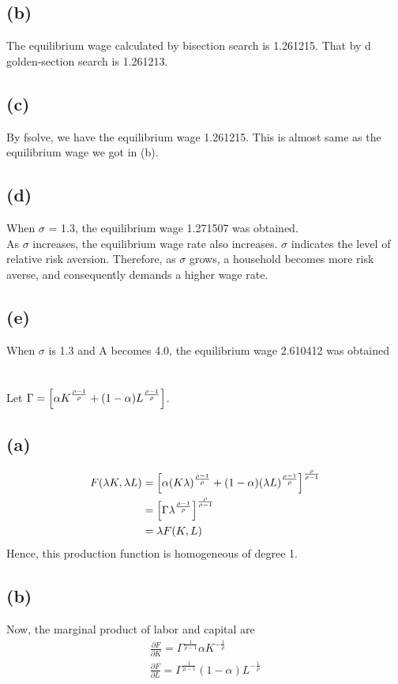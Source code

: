 \documentclass[a4paper]{article}
\begin{document}
\subsection*{(b)}
The equilibrium wage calculated by bisection search is 1.261215. That by d golden-section search is 1.261213.

\subsection*{(c)}
By fsolve, we have the equilibrium wage 1.261215. This is almost same as the equilibrium wage we got in (b).

\subsection*{(d)}
When $\sigma$ = 1.3, the equilibrium wage 1.271507 was obtained. \\
As $\sigma$ increases, the equilibrium wage rate also increases. $\sigma$ indicates the level of relative risk aversion. Therefore, as $\sigma$ grows, a household becomes more risk averse, and consequently demands a higher wage rate.

\subsection*{(e)}
When $\sigma$ is 1.3 and A becomes 4.0, the equilibrium wage 2.610412 was obtained


\section{} %
Let $\Gamma = \qty[ \alpha K^{\frac{\rho-1}{\rho}}+(1-\alpha)L^{\frac{\rho-1}{\rho}} ]$.

\subsection*{(a)}
\begin{align*}
    F(\lambda K, \lambda L) &= \qty[ \alpha (K\lambda)^{\frac{\rho-1}{\rho}}+(1-\alpha)(\lambda L)^{\frac{\rho-1}{\rho}} ]^{\frac{\rho}{\rho-1}}\\
    &=\qty[\Gamma \lambda^\frac{\rho-1}{\rho}]^{\frac{\rho}{\rho-1}}\\
    &= \lambda F(K,L)
\end{align*}
Hence, this production function is homogeneous of degree 1.



\subsection*{(b)}
Now, the marginal product of labor and capital are
\begin{gather*}
    \frac{\partial F}{\partial K} =  \Gamma^{\frac{1}{\rho-1}} \alpha K^{- \frac{1}{\rho}}\\
    \frac{\partial F }{\partial L } =  \Gamma^{\frac{1}{\rho-1}} (1-\alpha) L^{- \frac{1}{\rho}}
\end{gather*}
\end{document}
